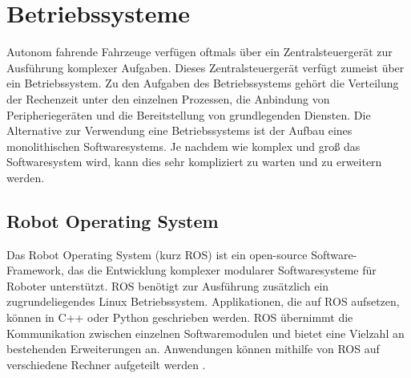 \section{Betriebssysteme}
Autonom fahrende Fahrzeuge verfügen oftmals über ein Zentralsteuergerät zur Ausführung komplexer Aufgaben. Dieses Zentralsteuergerät verfügt zumeist über ein Betriebssystem. Zu den Aufgaben des Betriebssystems gehört die Verteilung der Rechenzeit unter den einzelnen Prozessen, die Anbindung von Peripheriegeräten und die Bereitstellung von grundlegenden Diensten. Die Alternative zur Verwendung eine Betriebssystems ist der Aufbau eines monolithischen Softwaresystems. Je nachdem wie komplex und groß das Softwaresystem wird, kann dies sehr kompliziert zu warten und zu erweitern werden.

\subsection{Robot Operating System}
Das Robot Operating System (kurz ROS) ist ein open-source Software-Framework, das die Entwicklung komplexer modularer Softwaresysteme für Roboter unterstützt. ROS benötigt zur Ausführung zusätzlich ein zugrundeliegendes Linux Betriebssystem. Applikationen, die auf ROS aufsetzen, können in C++ oder Python geschrieben werden. ROS übernimmt die Kommunikation zwischen einzelnen Softwaremodulen und bietet eine Vielzahl an bestehenden Erweiterungen an. Anwendungen können mithilfe von ROS auf verschiedene Rechner aufgeteilt werden \cite{AND16}.

